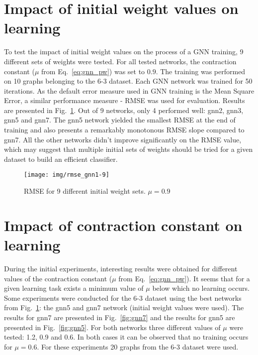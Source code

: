 \section{Impact of initial weight values on learning}
To test the impact of initial weight values on the process of a GNN training, 9 different sets of weights were tested. For all tested networks, the contraction constant ($\mu$ from Eq.~\ref{eq:gnn_pw}) was set to $0.9$. The training was performed on 10 graphs belonging to the 6-3 dataset. Each GNN network was trained for 50 iterations. As the default error measure used in GNN training is the Mean Square Error, a similar performance measure - RMSE was used for evaluation. Results are presented in Fig.~\ref{fig:gnn_multiple}. Out of 9 networks, only 4 performed well: gnn2, gnn3, gnn5 and gnn7. The gnn5 network yielded the smallest RMSE at the end of training and also presents a remarkably monotonous RMSE slope compared to gnn7. All the other networks didn't improve significantly on the RMSE value, which may suggest that multiple initial sets of weights should be tried for a given dataset to build an efficient classifier.

\begin{figure}[h!]
\begin{center}
	\texttt{[image: img/rmse\_gnn1-9]}
	\caption{RMSE for 9 different initial weight sets. $\mu = 0.9$}
	\label{fig:gnn_multiple}
\end{center}
\end{figure}

\newpage
\section{Impact of contraction constant on learning~\label{sec:contraction_constant}}
During the initial experiments, interesting results were obtained for different values of the contraction constant ($\mu$ from Eq.~\ref{eq:gnn_pw}). It seems that for a given learning task exists a minimum value of $\mu$ below which no learning occurs. Some experiments were conducted for the 6-3 dataset using the best networks from Fig.~\ref{fig:gnn_multiple}: the gnn5 and gnn7 network (initial weight values were used). The results for gnn7 are presented in Fig.~\ref{fig:gnn7} and the results for gnn5 are presented in Fig.~\ref{fig:gnn5}. For both networks three different values of $\mu$ were tested: 1.2, 0.9 and 0.6. In both cases it can be observed that no training occurs for $\mu = 0.6$. For these experiments 20 graphs from the 6-3 dataset were used.

